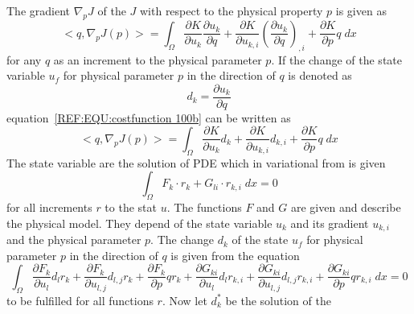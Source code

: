 The gradient $\nabla_{p} J$ of the  $J$ with respect to
the physical property $p$ is given as 
\begin{equation}\label{REF:EQU:costfunction 100b}
<q, \nabla_{p} J(p)> =    \int_{\Omega}
\displaystyle{\frac{\partial K }{\partial u_k }  } \displaystyle{\frac{\partial u_k }{\partial q }  } +
\displaystyle{\frac{\partial K }{\partial u_{k,i} }  } \left( \displaystyle{\frac{\partial u_k }{\partial q }  } \right)_{,i}+
\displaystyle{\frac{\partial K }{\partial p }  }  q \; dx
\end{equation}
for any $q$ as an increment to the physical parameter $p$. If the change 
  of the state variable
$u_f$ for physical parameter $p$ in the direction of $q$ is denoted as
\begin{equation}\label{REF:EQU:costfunction 100c}
d_k =\displaystyle{\frac{\partial u_k }{\partial q }  }
\end{equation} 
equation~\ref{REF:EQU:costfunction 100b} can be written as
\begin{equation}\label{REF:EQU:costfunction 100d}
<q, \nabla_{p} J(p)> =    \int_{\Omega}
\displaystyle{\frac{\partial K }{\partial u_k }  } d_k +
\displaystyle{\frac{\partial K }{\partial u_{k,i} }  } d_{k,i}+
\displaystyle{\frac{\partial K }{\partial p }  }  q \; dx
\end{equation}
The  state variable are the solution of PDE which in variational from is given
\begin{equation}\label{REF:EQU:costfunction 100}
\int_{\Omega} F_k \cdot r_k +  G_{li} \cdot r_{k,i} \; dx = 0 
\end{equation} 
for all increments $r$ to the stat $u$. The functions $F$ and $G$ are given and describe the physical
model. They depend of the state variable $u_{k}$ and its gradient $u_{k,i}$ and the physical parameter $p$. The change 
$d_k$  of the state 
$u_f$ for physical parameter $p$ in the direction of $q$ is given from the equation
\begin{equation}\label{REF:EQU:costfunction 100bb}
 \int_{\Omega} 
\displaystyle{\frac{\partial F_k }{\partial u_l }  } d_l r_k +
\displaystyle{\frac{\partial F_k }{\partial u_{l,j}} } d_{l,j} r_k +
\displaystyle{\frac{\partial F_k }{\partial p} }q r_k +
\displaystyle{\frac{\partial G_{ki}}{\partial u_l} } d_l r_{k,i} +
\displaystyle{\frac{\partial G_{ki}}{\partial u_{l,j}} } d_{l,j} r_{k,i}+
\displaystyle{\frac{\partial G_{ki}}{\partial p} } q r_{k,i}  
\; dx = 0  
\end{equation}
to be fulfilled for all functions $r$. Now let $d^*_k$ be the solution of the 
